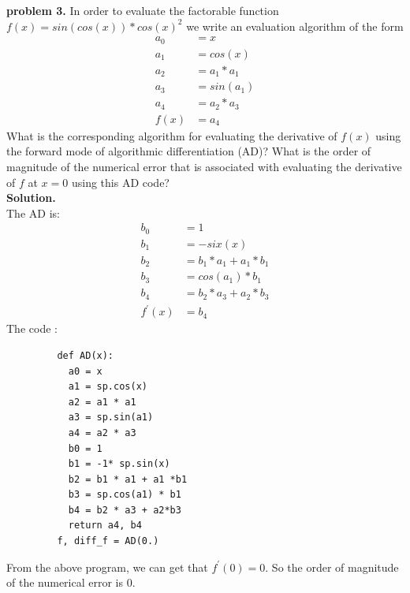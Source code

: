 \documentclass{article}
\begin{document}
\noindent \textbf{problem 3.} In order to evaluate the factorable function $f (x) = sin(cos(x))\ast cos(x)^{2}$ we write an evaluation algorithm of the form
    \begin{align*}
    a_{0} &= x\\
    a_{1} &= cos(x)\\
    a_{2} &= a_{1} \ast a_{1}\\
    a_{3} &= sin(a_1)\\
    a_{4} &= a_{2} \ast a_{3}\\
    f(x)  & = a_{4}
    \end{align*}
\indent  What is the corresponding algorithm for evaluating the derivative of $f(x)$ using the forward mode of algorithmic differentiation (AD)? What is the order of magnitude of the numerical error that is associated with evaluating the derivative of $f$ at $x = 0$ using this AD code?\\
\textbf{Solution.}\\
The AD is:
      \begin{align*}
         b_{0} &= 1\\
         b_{1} &= -six(x)\\
         b_{2} &= b_{1} \ast a_{1}+ a_{1}*b_{1}\\
         b_{3} &= cos(a_1) \ast  b_{1} \\
         b_{4} &= b_{2} \ast a_{3} + a_{2} \ast b_{3} \\
         f^{'}(x)  & =b_{4}
      \end{align*}
The code :
     \begin{lstlisting}
         def AD(x):
           a0 = x
           a1 = sp.cos(x)
           a2 = a1 * a1
           a3 = sp.sin(a1)
           a4 = a2 * a3
           b0 = 1
           b1 = -1* sp.sin(x)
           b2 = b1 * a1 + a1 *b1
           b3 = sp.cos(a1) * b1 
           b4 = b2 * a3 + a2*b3
           return a4, b4
         f, diff_f = AD(0.)
     \end{lstlisting}
 From the above program, we can get that $f^{'}(0) = 0$. So the order of magnitude of the numerical error is 0.
\end{document}

